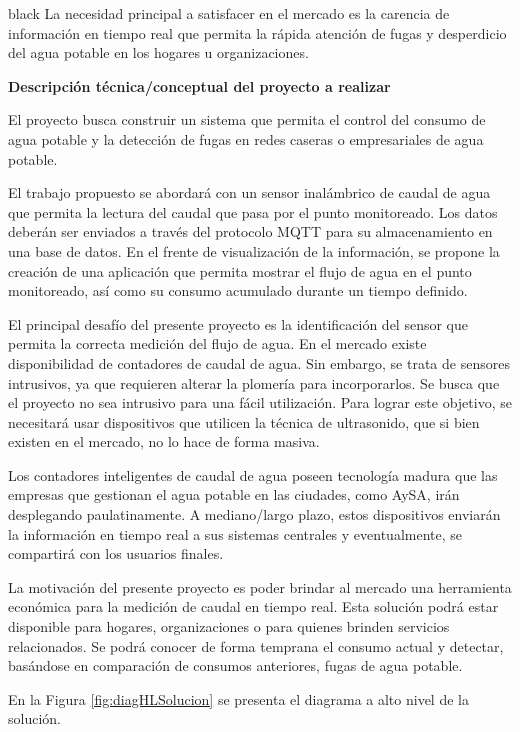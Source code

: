 \documentclass[
11pt, %
codirector, %
]{charter}
\begin{document}
\begin{consigna}{black}
La necesidad principal a satisfacer en el mercado es la carencia de información en tiempo real que permita la rápida atención de fugas y desperdicio del agua potable en los hogares u organizaciones.


\textbf{Descripción técnica/conceptual del proyecto a realizar} 

El proyecto busca construir un sistema que permita el control del consumo de agua potable y la detección de fugas en redes caseras o empresariales de agua potable. 

El trabajo propuesto se abordará con un sensor inalámbrico de caudal de agua que permita la lectura del caudal que pasa por el punto monitoreado. Los datos deberán ser enviados a través del protocolo MQTT para su almacenamiento en una base de datos. En el frente de visualización de la información, se propone la creación de una aplicación que permita mostrar el flujo de agua en el punto monitoreado, así como su consumo acumulado durante un tiempo definido. 

El principal desafío del presente proyecto es la identificación del sensor que permita la correcta medición del flujo de agua. En el mercado existe disponibilidad de contadores de caudal de agua. Sin embargo, se trata de sensores intrusivos, ya que requieren alterar la plomería para incorporarlos. Se busca que el proyecto no sea intrusivo para una fácil utilización. Para lograr este objetivo, se necesitará usar dispositivos que utilicen la técnica de ultrasonido, que si bien existen en el mercado, no lo hace de forma masiva.

Los contadores inteligentes de caudal de agua poseen tecnología madura que las empresas que gestionan el agua potable en las ciudades, como AySA, irán desplegando paulatinamente. A mediano/largo plazo, estos dispositivos enviarán la información en tiempo real a sus sistemas centrales y eventualmente, se compartirá con los usuarios finales.

La motivación del presente proyecto es poder brindar al mercado una herramienta económica para la medición de caudal en tiempo real. Esta solución podrá estar disponible para hogares, organizaciones o para quienes brinden servicios relacionados. Se podrá conocer de forma temprana el consumo actual y detectar, basándose en comparación de consumos anteriores, fugas de agua potable.

En la Figura \ref{fig:diagHLSolucion} se presenta el diagrama a alto nivel de la solución.




\end{consigna}
\end{document}
